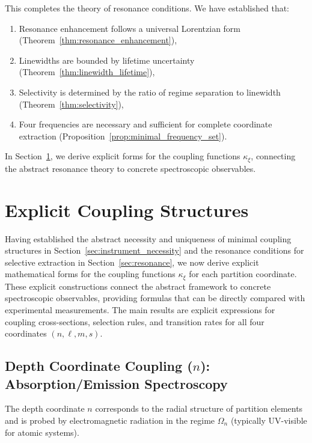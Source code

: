 \documentclass[twocolumn,10pt,a4paper]{article}
\theoremstyle{remark}
\begin{document}
This completes the theory of resonance conditions. We have established that:
\begin{enumerate}[label=(\alph*), noitemsep]
    \item Resonance enhancement follows a universal Lorentzian form (Theorem~\ref{thm:resonance_enhancement}),
    \item Linewidths are bounded by lifetime uncertainty (Theorem~\ref{thm:linewidth_lifetime}),
    \item Selectivity is determined by the ratio of regime separation to linewidth (Theorem~\ref{thm:selectivity}),
    \item Four frequencies are necessary and sufficient for complete coordinate extraction (Proposition~\ref{prop:minimal_frequency_set}).
\end{enumerate}

In Section~\ref{sec:explicit_coupling}, we derive explicit forms for the coupling functions $\kappa_\xi$, connecting the abstract resonance theory to concrete spectroscopic observables.


\section{Explicit Coupling Structures}
\label{sec:explicit_coupling}

Having established the abstract necessity and uniqueness of minimal coupling structures in Section~\ref{sec:instrument_necessity} and the resonance conditions for selective extraction in Section~\ref{sec:resonance}, we now derive explicit mathematical forms for the coupling functions $\kappa_\xi$ for each partition coordinate. These explicit constructions connect the abstract framework to concrete spectroscopic observables, providing formulas that can be directly compared with experimental measurements. The main results are explicit expressions for coupling cross-sections, selection rules, and transition rates for all four coordinates $(n, \ell, m, s)$.

\subsection{Depth Coordinate Coupling ($n$): Absorption/Emission Spectroscopy}

The depth coordinate $n$ corresponds to the radial structure of partition elements and is probed by electromagnetic radiation in the regime $\Omega_n$ (typically UV-visible for atomic systems).
\end{document}
